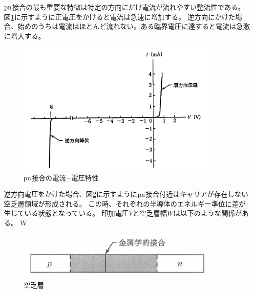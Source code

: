 $\rm{pn}$接合の最も重要な特徴は特定の方向にだけ電流が流れやすい整流性である。図\ref{pn_iv}に示すように正電圧をかけると電流は急速に増加する。
逆方向にかけた場合、始めのうちは電流はほとんど流れない。ある臨界電圧に達すると電流は急激に増大する。

\begin{figure}[bpt]\centering
\includegraphics[width=10cm]{pn_iv}
\caption[$\rm{pn}$接合の電流$-$電圧特性]{$\rm{pn}$接合の電流$-$電圧特性\cite{2-1}}
\label{pn_iv}
\end{figure}

逆方向電圧をかけた場合、図\ref{depletion_field}に示すように$\rm{pn}$接合付近はキャリアが存在しない空乏層領域が形成される。
この時、それぞれの半導体のエネルギー準位に差が生じている状態となっている。
印加電圧$V$と空乏層幅$W$は以下のような関係がある。
\bbb
W \propto {}
\eee

\begin{figure}[bpt]\centering
\includegraphics[width=10cm]{depletion_field}
\caption[空乏層]{空乏層\cite{2-1}}
\label{depletion_field}
\end{figure}


